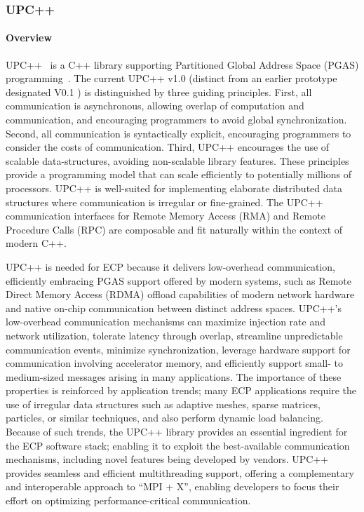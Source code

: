 \subsubsection{ UPC++\label{subsubsect:upcxx}} 
\paragraph{Overview} 

UPC++~\cite{upcxx-site} is a C++ library
supporting Partitioned Global Address Space (PGAS) programming~\cite{upcxx-ipdps19,upcxx-guide,upcxx-spec}.
The current UPC++ v1.0 (distinct from an earlier prototype designated V0.1
\cite{zheng:ipdps14}) is distinguished by three guiding principles.
First, all communication is asynchronous, allowing overlap of computation and
communication, and encouraging programmers to avoid global synchronization. Second, all communication
is syntactically explicit, encouraging programmers to consider the costs of communication. Third,
UPC++ encourages the use of scalable data-structures,
avoiding non-scalable library features.
These principles provide a programming model that can
scale efficiently to potentially millions of processors.
UPC++ is well-suited for implementing elaborate distributed data structures where
communication is irregular or fine-grained. 
The UPC++ communication interfaces for Remote Memory Access (RMA) 
and Remote Procedure Calls (RPC)
are composable and fit naturally within the context of modern C++.

UPC++ is needed for ECP because it delivers low-overhead communication,
efficiently embracing PGAS support offered by modern systems,
such as Remote Direct Memory Access (RDMA) offload capabilities of modern
network hardware and native on-chip communication between distinct address
spaces.  
UPC++'s low-overhead communication mechanisms can maximize injection rate and
network utilization, tolerate latency through overlap, streamline unpredictable
communication events, minimize synchronization, leverage hardware support for
communication involving accelerator memory, and efficiently support small- to
medium-sized messages arising in many applications.
The importance of these properties is reinforced by application trends; many
ECP applications require the use of irregular data structures such as adaptive
meshes, sparse matrices, particles, or similar techniques, and also perform
dynamic load balancing.
Because of such trends, the UPC++ library provides an essential ingredient for
the ECP software stack; enabling it to exploit the best-available communication
mechanisms, including novel features being developed by vendors.  UPC++
provides seamless and efficient multithreading support, offering a
complementary and interoperable approach to ``MPI + X'', enabling developers to
focus their effort on optimizing performance-critical communication.

